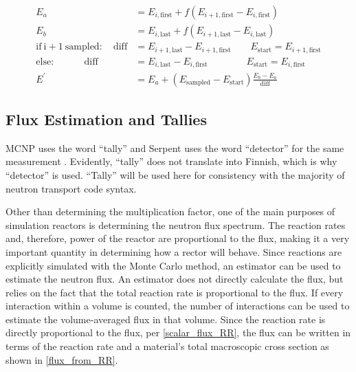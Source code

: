 \begin{equation}
\label{energy_scaling}
\begin{split}
E_a &= E_{i,\mathrm{first}} +  f( E_{i+1,\mathrm{first}} - E_{i,\mathrm{first}} ) \\
E_b &= E_{i,\mathrm{last}} +  f( E_{i+1,\mathrm{last}} - E_{i,\mathrm{last}} ) \\
\mathrm{if\:i+1\:sampled:} \quad \mathrm{diff} &= E_{i+1,\mathrm{last}}  - E_{i+1,\mathrm{first}}  \qquad E_\mathrm{start}= E_{i+1,\mathrm{first}}  \\
\mathrm{else:}          \qquad \quad       \mathrm{diff} &= E_{i,\mathrm{last}}  - E_{i,\mathrm{first}}  \qquad \qquad E_\mathrm{start}= E_{i,\mathrm{first}}  \\
E^\prime &=  E_a  +  ( E_\mathrm{sampled} - E_\mathrm{start})  \frac{ E_b - E_a}{ \mathrm{diff} }  
\end{split}
\end{equation}%


\subsection{Flux Estimation and Tallies}

MCNP uses the word ``tally'' and Serpent uses the word ``detector'' for the same measurement \cite{serpent,mcnp}.  Evidently, ``tally'' does not translate into Finnish, which is why ``detector'' is used.  ``Tally'' will be used here for consistency with the majority of neutron transport code syntax.  

Other than determining the multiplication factor, one of the main purposes of simulation reactors is determining the neutron flux spectrum.  The reaction rates and, therefore, power of the reactor are proportional to the flux, making it a very important quantity in determining how a rector will behave.  Since reactions are explicitly simulated with the  Monte Carlo method, an estimator can be used to estimate the neutron flux.  An estimator does not directly calculate the flux, but relies on the fact that the total reaction rate is proportional to the flux.  
If every interaction within a volume is counted, the number of interactions can be used to estimate the volume-averaged flux in that volume.  Since the reaction rate is directly proportional to the flux, per \eqref{scalar_flux_RR}, the flux can be written in terms of the reaction rate and a material's total macroscopic cross section as shown in \eqref{flux_from_RR}.

